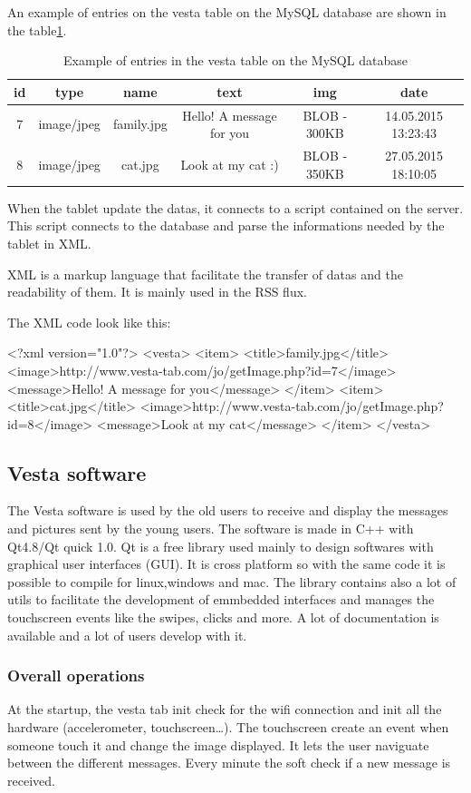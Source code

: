 An example of entries on the vesta table on the MySQL database are shown in the table\ref{tab:database}.

\begin{table}
\begin{tabular}{|c|c|c|c|c|c|}
  \hline
  id & type & name & text & img & date \\
  \hline
  7 & image/jpeg & family.jpg & Hello! A message for you & BLOB - 300KB & 14.05.2015 13:23:43 \\
  8 & image/jpeg & cat.jpg & Look at my cat :) & BLOB - 350KB & 27.05.2015 18:10:05 \\
  \hline
\end{tabular}
\caption {Example of entries in the vesta table on the MySQL database}\label{tab:database}
\end{table}

When the tablet update the datas, it connects to a script contained on the server. This script connects to the database and parse the informations needed by the tablet in XML.

XML is a markup language that facilitate the transfer of datas and the readability of them. It is mainly used in the RSS flux.

The XML code look like this:

<?xml version="1.0"?>
<vesta>
  <item>
    <title>family.jpg</title>
    <image>http://www.vesta-tab.com/jo/getImage.php?id=7</image>
    <message>Hello! A message for you</message>
  </item>
  <item>
    <title>cat.jpg</title>
    <image>http://www.vesta-tab.com/jo/getImage.php?id=8</image>
    <message>Look at my cat</message>
  </item>
</vesta>

\subsection{Vesta software}
The Vesta software is used by the old users to receive and display the messages and pictures sent by the young users.
The software is made in C++ with Qt4.8/Qt quick 1.0. Qt is a free library used mainly to design softwares with graphical user interfaces (GUI). It is cross platform so with the same code it is possible to compile for linux,windows and mac.
The library contains also a lot of utils to facilitate the development of emmbedded interfaces and manages the touchscreen events like the swipes, clicks and more. A lot of documentation is available and a lot of users develop with it.

\subsubsection{Overall operations}
At the startup, the vesta tab init check for the wifi connection and init all the hardware (accelerometer, touchscreen…). The touchscreen create an event when someone touch it and change the image displayed. It lets the user naviguate between the different messages. Every minute the soft check if a new message is received.

